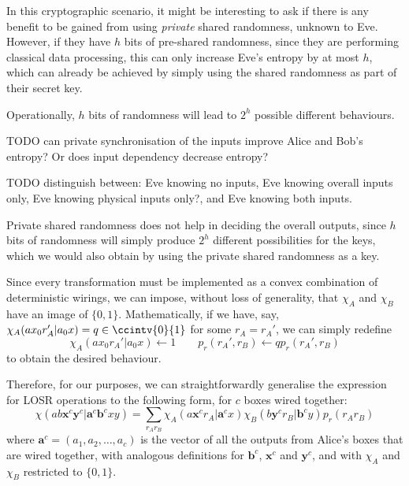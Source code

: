 \documentclass[10pt, a4paper]{article}
\numberwithin{equation}{section} %
\theoremstyle{definition}
\theoremstyle{plain}
\newcommand{\?}{\mathrel{?}} %
\newcommand{\cvec}[1]{\boldsymbol{\mathbf{#1}}}    %
\begin{document}
      In this cryptographic scenario, it might be interesting to ask if there is any benefit to be gained from using \emph{private} shared randomness, unknown to Eve. However, if they have \(h\) bits of pre-shared randomness, since they are performing classical data processing, this can only increase Eve's entropy by at most \(h\), which can already be achieved by simply using the shared randomness as part of their secret key.

      Operationally, \(h\) bits of randomness will lead to \(2^h\) possible different behaviours.

      TODO can private synchronisation of the inputs improve Alice and Bob's entropy? Or does input dependency decrease entropy?

      TODO distinguish between: Eve knowing no inputs, Eve knowing overall inputs only, Eve knowing physical inputs only?, and Eve knowing both inputs.

      Private shared randomness does not help in deciding the overall outputs, since \(h\) bits of randomness will simply produce \(2^h\) different possibilities for the keys, which we would also obtain by using the private shared randomness as a key.

      Since every transformation must be implemented as a convex combination of deterministic wirings, we can impose, without loss of generality, that \(\chi_A\) and \(\chi_B\) have an image of \(\{0,1\}\). Mathematically, if we have, say, \(\chi_A(ax_0r_A'|a_0x) = q \in \ccintv{0}{1}\) for some \(r_A = r_A'\), we can simply redefine
      \[ \chi_A(ax_0r_A'|a_0x) \gets 1 \qquad p_r(r_A', r_B) \gets qp_r(r_A', r_B) \]
      to obtain the desired behaviour.

      Therefore, for our purposes, we can straightforwardly generalise the expression for LOSR operations to the following form, for \(c\) boxes wired together:
      \begin{equation}\label{eqn:wiringdef}
        \chi(ab\cvec{x}^c\cvec{y}^c|\cvec{a}^c\cvec{b}^cxy) = \sum_{r_A r_B} \chi_A(a\cvec{x}^c r_A|\cvec{a}^cx) \chi_B(b\cvec{y}^c r_B|\cvec{b}^cy) p_r(r_A r_B)
      \end{equation}
      where \(\cvec{a}^c = (a_1, a_2, \ldots, a_c)\) is the vector of all the outputs from Alice's boxes that are wired together, with analogous definitions for \(\cvec{b}^c\), \(\cvec{x}^c\) and \(\cvec{y}^c\), and with \(\chi_A\) and \(\chi_B\) restricted to \(\{0,1\}\).
\end{document}
